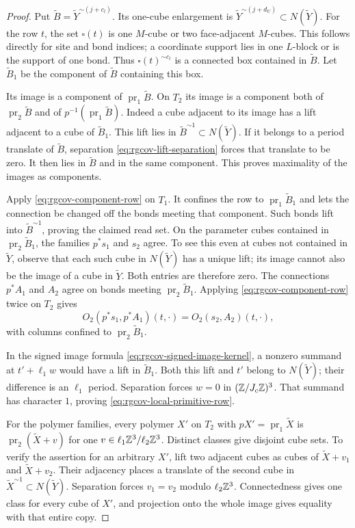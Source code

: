 \begin{proof}
Put $\widetilde B=\widetilde Y^{\sim(j+c_l)}$.
Its one-cube enlargement is
$\widetilde Y^{\sim(j+d_U)}\subset N(\widetilde Y)$.
For the row $t$, the set $\square(t)$ is one $M$-cube
or two face-adjacent $M$-cubes. This follows directly
for site and bond indices; a coordinate support lies
in one $L$-block or is the support of one bond.
Thus $\square(t)^{\sim c_l}$ is a connected box
contained in $\widetilde B$.
Let $\widetilde B_1$ be the component of $\widetilde B$
containing this box.

Its image is a component of
$\operatorname{pr}_1\widetilde B$.
On $T_2$ its image is a component both of
$\operatorname{pr}_2\widetilde B$ and of
$p^{-1}(\operatorname{pr}_1\widetilde B)$.
Indeed a cube adjacent to its image has a lift adjacent
to a cube of $\widetilde B_1$. This lift lies in
$\widetilde B^{\sim1}\subset N(\widetilde Y)$.
If it belongs to a period translate of $\widetilde B$,
separation \eqref{eq:rgcov-lift-separation} forces that
translate to be zero. It then lies in $\widetilde B$
and in the same component. This proves maximality
of the images as components.

Apply \eqref{eq:rgcov-component-row} on $T_1$.
It confines the row to $\operatorname{pr}_1\widetilde B_1$
and lets the connection be changed off the bonds meeting
that component. Such bonds lift into
$\widetilde B^{\sim1}$, proving the claimed read set.
On the parameter cubes contained in
$\operatorname{pr}_2\widetilde B_1$, the families
$p^*s_1$ and $s_2$ agree. To see this even at cubes
not contained in $\widetilde Y$, observe that each
such cube in $N(\widetilde Y)$ has a unique lift;
its image cannot also be the image of a cube in
$\widetilde Y$. Both entries are therefore zero.
The connections $p^*A_1$ and $A_2$ agree on bonds
meeting $\operatorname{pr}_2\widetilde B_1$.
Applying \eqref{eq:rgcov-component-row} twice on $T_2$
gives
\[
 O_2(p^*s_1,p^*A_1)(t,\cdot)
       =O_2(s_2,A_2)(t,\cdot),
\]
with columns confined to $\operatorname{pr}_2\widetilde B_1$.

In the signed image formula
\eqref{eq:rgcov-signed-image-kernel}, a nonzero summand
at $t'+\ell_1w$ would have a lift in $\widetilde B_1$.
Both this lift and $t'$ belong to $N(\widetilde Y)$;
their difference is an $\ell_1$ period.
Separation forces $w=0$ in $(\mathbb Z/J_c\mathbb Z)^3$.
That summand has character $1$, proving
\eqref{eq:rgcov-local-primitive-row}.

For the polymer families, every polymer $X'$ on $T_2$
with $pX'=\operatorname{pr}_1\widetilde X$ is
$\operatorname{pr}_2(\widetilde X+v)$ for one
$v\in\ell_1\mathbb Z^3/\ell_2\mathbb Z^3$.
Distinct classes give disjoint cube sets.
To verify the assertion for an arbitrary $X'$, lift
two adjacent cubes as cubes of $\widetilde X+v_1$
and $\widetilde X+v_2$. Their adjacency places a
translate of the second cube in
$\widetilde X^{\sim1}\subset N(\widetilde Y)$.
Separation forces $v_1=v_2$ modulo $\ell_2\mathbb Z^3$.
Connectedness gives one class for every cube of $X'$,
and projection onto the whole image gives equality
with that entire copy.


\end{proof}
